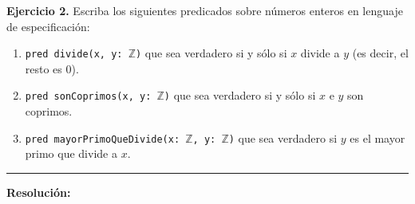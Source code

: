 \hypertarget{ej2}{}
\noindent \textbf{Ejercicio 2.} Escriba los siguientes predicados sobre números enteros en lenguaje de especificación:

\begin{enumerate}[label=\alph*)]
    \item \texttt{pred divide(x, y: $\mathbb{Z}$)} que sea verdadero si y sólo si $x$ divide a $y$ (es decir, el resto es 0).
    \item \texttt{pred sonCoprimos(x, y: $\mathbb{Z}$)} que sea verdadero si y sólo si $x$ e $y$ son coprimos.
    \item \texttt{pred mayorPrimoQueDivide(x: $\mathbb{Z}$, y: $\mathbb{Z}$)} que sea verdadero si $y$ es el mayor primo que divide a $x$.
\end{enumerate}

\vspace{0.2cm}
{\color{gray}\hrule}
\vspace{0.4cm}

\textbf{Resolución:}

